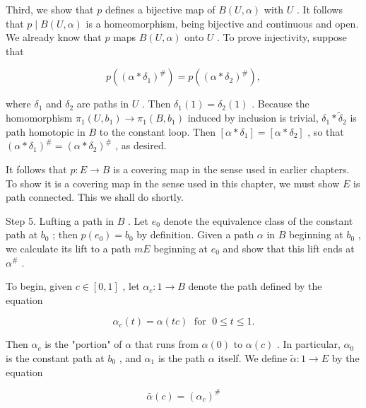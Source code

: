 Third, we show that \(p\) defines a bijective map of \(B\left( {U,\alpha }\right)\) with \(U\) . It follows that \(p \mid  B\left( {U,\alpha }\right)\) is a homeomorphism, being bijective and continuous and open. We already know that \(p\) maps \(B\left( {U,\alpha }\right)\) onto \(U\) . To prove injectivity, suppose that

\[
p\left( {\left( \alpha  * {\delta }_{1}\right) }^{\# }\right)  = p\left( {\left( \alpha  * {\delta }_{2}\right) }^{\# }\right) ,
\]

where \({\delta }_{1}\) and \({\delta }_{2}\) are paths in \(U\) . Then \({\delta }_{1}\left( 1\right)  = {\delta }_{2}\left( 1\right)\) . Because the homomorphism \({\pi }_{1}\left( {U,{b}_{1}}\right)  \rightarrow  {\pi }_{1}\left( {B,{b}_{1}}\right)\) induced by inclusion is trivial, \({\delta }_{1} * {\widetilde{\delta }}_{2}\) is path homotopic in \(B\) to the constant loop. Then \(\left\lbrack  {\alpha  * {\delta }_{1}}\right\rbrack   = \left\lbrack  {\alpha  * {\delta }_{2}}\right\rbrack\) , so that \({\left( \alpha  * {\delta }_{1}\right) }^{\# } = {\left( \alpha  * {\delta }_{2}\right) }^{\# }\) , as desired.

It follows that \(p : E \rightarrow  B\) is a covering map in the sense used in earlier chapters. To show it is a covering map in the sense used in this chapter, we must show \(E\) is path connected. This we shall do shortly.

Step 5. Lufting a path in \(B\) . Let \({e}_{0}\) denote the equivalence class of the constant path at \({b}_{0}\) ; then \(p\left( {e}_{0}\right)  = {b}_{0}\) by definition. Given a path \(\alpha\) in \(B\) beginning at \({b}_{0}\) , we calculate its lift to a path \({mE}\) beginning at \({e}_{0}\) and show that this lift ends at \({\alpha }^{\# }\) .

To begin, given \(c \in  \left\lbrack  {0,1}\right\rbrack\) , let \({\alpha }_{c} : 1 \rightarrow  B\) denote the path defined by the equation

\[
{\alpha }_{c}\left( t\right)  = \alpha \left( {tc}\right) \;\text{ for }\;0 \leq  t \leq  1.
\]

Then \({\alpha }_{c}\) is the "portion" of \(\alpha\) that runs from \(\alpha \left( 0\right)\) to \(\alpha \left( c\right)\) . In particular, \({\alpha }_{0}\) is the constant path at \({b}_{0}\) , and \({\alpha }_{1}\) is the path \(\alpha\) itself. We define \(\widetilde{\alpha } : 1 \rightarrow  E\) by the equation

\[
\bar{\alpha }\left( c\right)  = {\left( {\alpha }_{c}\right) }^{\# }
\]

